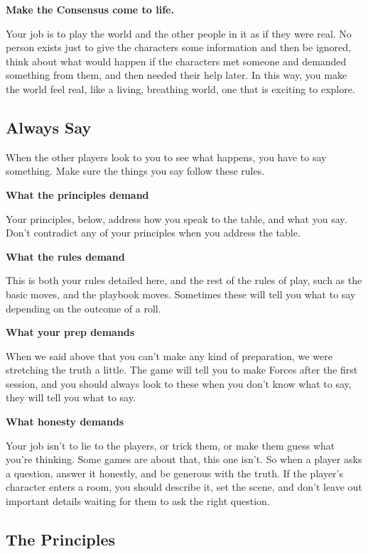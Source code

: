 \documentclass[
]{article}
\begin{document}
\textbf{Make the Consensus come to life.}

Your job is to play the world and the other people in it as if they were
real. No person exists just to give the characters some information and
then be ignored, think about what would happen if the characters met
someone and demanded something from them, and then needed their help
later. In this way, you make the world feel real, like a living,
breathing world, one that is exciting to explore.

\hypertarget{always-say}{%
\subsection{Always Say}\label{always-say}}

When the other players look to you to see what happens, you have to say
something. Make sure the things you say follow these rules.

\textbf{What the principles demand}

Your principles, below, address how you speak to the table, and what you
say. Don't contradict any of your principles when you address the table.

\textbf{What the rules demand}

This is both your rules detailed here, and the rest of the rules of
play, such as the basic moves, and the playbook moves. Sometimes these
will tell you what to say depending on the outcome of a roll.

\textbf{What your prep demands}

When we said above that you can't make any kind of preparation, we were
stretching the truth a little. The game will tell you to make Forces
after the first session, and you should always look to these when you
don't know what to say, they will tell you what to say.

\textbf{What honesty demands}

Your job isn't to lie to the players, or trick them, or make them guess
what you're thinking. Some games are about that, this one isn't. So when
a player asks a question, answer it honestly, and be generous with the
truth. If the player's character enters a room, you should describe it,
set the scene, and don't leave out important details waiting for them to
ask the right question.

\hypertarget{the-principles}{%
\subsection{The Principles}\label{the-principles}}
\end{document}
